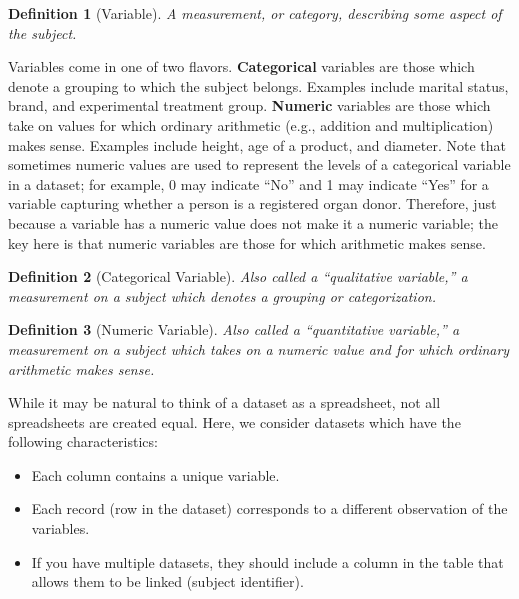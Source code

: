 \documentclass[
]{book}
\providecommand{\tightlist}{%
  \setlength{\itemsep}{0pt}\setlength{\parskip}{0pt}}
\theoremstyle{plain}
\theoremstyle{mydefn}
\newtheorem{definition}{Definition}[chapter]
\theoremstyle{myexmpl}
\theoremstyle{remark}
\begin{document}
\begin{definition}[Variable]
\protect\hypertarget{def:defn-variable}{}{\label{def:defn-variable} {} }A measurement, or category, describing some aspect of the subject.
\end{definition}

Variables come in one of two flavors. \textbf{Categorical} variables are those which denote a grouping to which the subject belongs. Examples include marital status, brand, and experimental treatment group. \textbf{Numeric} variables are those which take on values for which ordinary arithmetic (e.g., addition and multiplication) makes sense. Examples include height, age of a product, and diameter. Note that sometimes numeric values are used to represent the levels of a categorical variable in a dataset; for example, 0 may indicate ``No'' and 1 may indicate ``Yes'' for a variable capturing whether a person is a registered organ donor. Therefore, just because a variable has a numeric value does not make it a numeric variable; the key here is that numeric variables are those for which arithmetic makes sense.

\begin{definition}[Categorical Variable]
\protect\hypertarget{def:defn-categorical}{}{\label{def:defn-categorical} {} }Also called a ``qualitative variable,'' a measurement on a subject which denotes a grouping or categorization.
\end{definition}

\begin{definition}[Numeric Variable]
\protect\hypertarget{def:defn-numeric}{}{\label{def:defn-numeric} {} }Also called a ``quantitative variable,'' a measurement on a subject which takes on a numeric value \emph{and} for which ordinary arithmetic makes sense.
\end{definition}

While it may be natural to think of a dataset as a spreadsheet, not all spreadsheets are created equal. Here, we consider datasets which have the following characteristics:

\begin{itemize}
\tightlist
\item
  Each column contains a unique variable.
\item
  Each record (row in the dataset) corresponds to a different observation of the variables.
\item
  If you have multiple datasets, they should include a column in the table that allows them to be linked (subject identifier).
\end{itemize}
\end{document}

